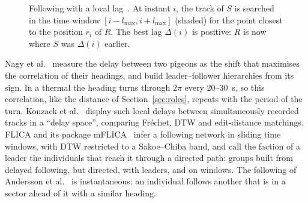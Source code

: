 \begin{figure}
\centering
{}
\caption{Following with a local lag~\cite{li2013}. At instant $i$, the track of $S$ is searched
in the time window $[i-l_{\max}, i+l_{\max}]$ (shaded) for the point closest to the position
$r_i$ of $R$. The best lag $\Delta(i)$ is positive: $R$ is now where $S$ was $\Delta(i)$
earlier.}
\label{fig:li}
\end{figure}

Nagy et al.~\cite{nagy2010} measure the delay between two pigeons as the shift that maximises the
correlation of their headings, and build leader--follower hierarchies from its sign. In a thermal
the heading turns through $2\pi$ every 20--30~s, so this correlation, like the distance of
Section~\ref{sec:roles}, repeats with the period of the turn. Konzack et al.~\cite{konzack2017}
display such local delays between simultaneously recorded tracks in a ``delay space'', comparing
Fréchet, DTW and edit-distance matchings. FLICA and its package
mFLICA~\cite{amornbunchornvej2018a,amornbunchornvej2018b,amornbunchornvej2021} infer a following
network in sliding time windows, with DTW restricted to a Sakoe--Chiba band, and call the faction
of a leader the individuals that reach it through a directed path: groups built from delayed
following, but directed, with leaders, and on windows. The following of Andersson et
al.~\cite{andersson2007} is instantaneous: an individual follows another that is in a sector
ahead of it with a similar heading.

